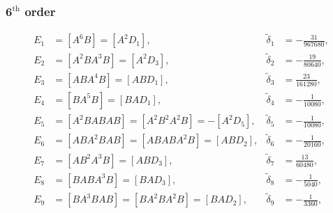 \documentclass[12pt]{article}
\begin{document}
\subsubsection*{$\mathbf{6}^{\textrm{th}}$ order}

\vspace{0.1cm}

\begin{equation}
  \begin{aligned}
    \nonumber
    E_{1} &= \left [ A^{6} B \right ] = \left [ A^{2} D_{1} \right ], & \tilde{\delta}_{1} &= -\frac{31}{967 680}, \\
    E_{2} &= \left [ A^{2} B A^{3} B \right ] = \left [ A^{2} D_{3} \right ], & \tilde{\delta}_{2} &= -\frac{19}{80 640}, \\
    E_{3} &= \left [ A B A^{4} B \right ] = \left [ A B D_{1} \right ], & \tilde{\delta}_{3} &= \frac{23}{161 280}, \\
    E_{4} &= \left [ B A^{5} B \right ] = \left [ B A D_{1} \right ], & \tilde{\delta}_{4} &= -\frac{1}{10 080}, \\
    E_{5} &= \left [ A^{2} B A B A B \right ] = \left [ A^{2} B^{2} A^{2} B \right ] = -\left [ A^{2} D_{5} \right ], & \tilde{\delta}_{5} &= -\frac{1}{10 080}, \\
    E_{6} &= \left [ A B A^{2} B A B \right ] = \left [ A B A B A^{2} B \right ] = \left [ A B D_{2} \right ], & \tilde{\delta}_{6} &= -\frac{1}{20 160}, \\
    E_{7} &= \left [ A B^{2} A^{3} B \right ] = \left [ A B D_{3} \right ], & \tilde{\delta}_{7} &= \frac{13}{60 480}, \\
    E_{8} &= \left [ B A B A^{3} B \right ] = \left [ B A D_{3} \right ], & \tilde{\delta}_{8} &= -\frac{1}{5040}, \\
    E_{9} &= \left [ B A^{3} B A B \right ] = \left [ B A^{2} B A^{2} B \right ] = \left [ B A D_{2} \right ], & \tilde{\delta}_{9} &= -\frac{1}{3360}, \\
  \end{aligned}
\end{equation}

\vspace{0.1cm}
\end{document}
